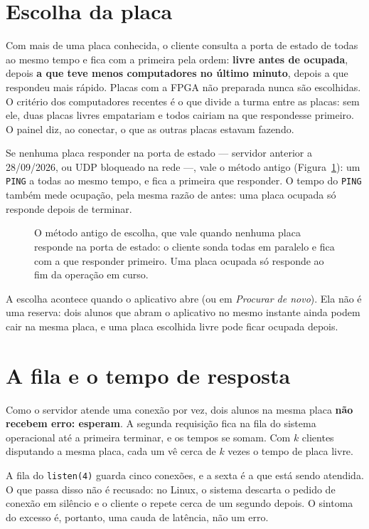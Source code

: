 \section{Escolha da placa}

Com mais de uma placa conhecida, o cliente consulta a porta de estado de todas
ao mesmo tempo e fica com a primeira pela ordem: \textbf{livre antes de
ocupada}, depois \textbf{a que teve menos computadores no último minuto},
depois a que respondeu mais rápido. Placas com a FPGA não preparada nunca são
escolhidas. O critério dos computadores recentes é o que divide a turma entre as
placas: sem ele, duas placas livres empatariam e todos cairiam na que respondesse
primeiro. O painel diz, ao conectar, o que as outras placas estavam fazendo.

Se nenhuma placa responder na porta de estado --- servidor anterior a
28/09/2026, ou UDP bloqueado na rede ---, vale o método antigo
(Figura~\ref{fig:escolha-placa}): um \texttt{PING} a todas ao mesmo tempo, e fica
a primeira que responder. O tempo do \texttt{PING} também mede ocupação, pela
mesma razão de antes: uma placa ocupada só responde depois de terminar.

\begin{figure}[htbp]
  \centering
  \caption{O método antigo de escolha, que vale quando nenhuma placa responde
    na porta de estado: o cliente sonda todas em paralelo e fica com a que
    responder primeiro. Uma placa ocupada só responde ao fim da operação em
    curso.}
  \label{fig:escolha-placa}
\end{figure}

A escolha acontece quando o aplicativo abre (ou em \emph{Procurar de novo}). Ela não
é uma reserva: dois alunos que abram o aplicativo no mesmo instante ainda podem
cair na mesma placa, e uma placa escolhida livre pode ficar ocupada depois.

\section{A fila e o tempo de resposta}

Como o servidor atende uma conexão por vez, dois alunos na mesma placa
\textbf{não recebem erro: esperam}. A segunda requisição fica na fila do sistema
operacional até a primeira terminar, e os tempos se somam. Com \(k\) clientes
disputando a mesma placa, cada um vê cerca de \(k\) vezes o tempo de placa
livre.

A fila do \texttt{listen(4)} guarda cinco conexões, e a sexta é a que está
sendo atendida. O que passa disso não é recusado: no Linux, o sistema descarta
o pedido de conexão em silêncio e o cliente o repete cerca de um segundo
depois. O sintoma do excesso é, portanto, uma cauda de latência, não um erro.

